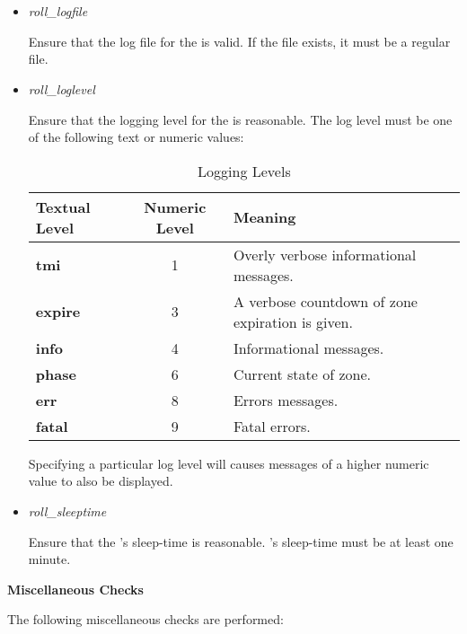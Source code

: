 \begin{itemize}

\item {\it roll\_logfile}\verb" "

Ensure that the log file for the  is valid.  If the file
exists, it must be a regular file.

\item {\it roll\_loglevel}\verb" "

Ensure that the logging level for the  is reasonable.  The
log level must be one of the following text or numeric values:

\begin{table}[ht]
\begin{center}
\begin{tabular}{|l|c|l|}
\hline
{\bf Textual Level} & {\bf Numeric Level} & {\bf Meaning} \\
\hline
{\bf tmi}    & 1 & Overly verbose informational messages.		\\
{\bf expire} & 3 & A verbose countdown of zone expiration is given.	\\
{\bf info}   & 4 & Informational messages.				\\
{\bf phase}  & 6 & Current state of zone.				\\
{\bf err}    & 8 & Errors messages.					\\
{\bf fatal}  & 9 & Fatal errors.					\\
\hline
\end{tabular}
\end{center}
\caption{Logging Levels}
\end{table}

Specifying a particular log level will causes messages of a higher numeric
value to also be displayed.

\item {\it roll\_sleeptime}\verb" "

Ensure that the 's sleep-time is reasonable.
's sleep-time must be at least one minute.

\end{itemize}

{\bf Miscellaneous Checks}

The following miscellaneous checks are performed:

